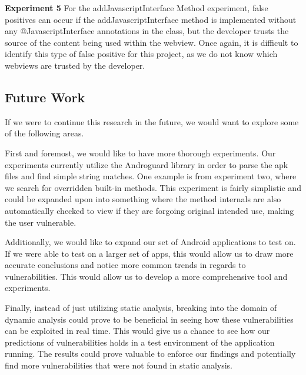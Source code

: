 \textbf{Experiment 5}
For the addJavascriptInterface Method experiment, false positives can occur if the addJavascriptInterface method is implemented without any @JavascriptInterface annotations in the class, but the developer 
trusts the source of the content being used within the webview. Once again, it is difficult to identify this type of false positive for this project, as we do not know which webviews are trusted by the developer. 

\subsection{Future Work}
If we were to continue this research in the future, we would 
want to explore some of the following areas. 

First and foremost, we would like to have more thorough experiments. 
Our experiments currently utilize the Androguard library in 
order to parse the apk files and find simple string matches. 
One example is from experiment two, where we search for 
overridden built-in methods. This experiment is fairly simplistic
and could be expanded upon into something where the method 
internals are also automatically checked to view if they are 
forgoing original intended use, making the user vulnerable.

Additionally, we would like to expand our set of Android 
applications to test on. If we were able to test on a larger 
set of apps, this would allow us to draw more accurate 
conclusions and notice more common trends in regards to 
vulnerabilities. This would allow us to develop a more 
comprehensive tool and experiments. 

Finally, instead of just utilizing static analysis, breaking 
into the domain of dynamic analysis could prove to be beneficial 
in seeing how these vulnerabilities can be exploited in real time. 
This would give us a chance to see how our predictions of 
vulnerabilities holds in a test environment of the application 
running. The results could prove valuable to enforce our 
findings and potentially find more vulnerabilities that were 
not found in static analysis. 
